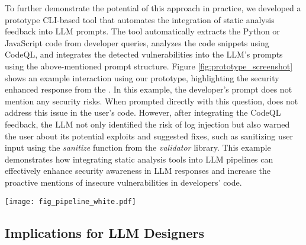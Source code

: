 To further demonstrate the potential of this approach in practice, we developed a prototype CLI-based tool that automates the integration of static analysis feedback into LLM prompts. The tool automatically extracts the Python or JavaScript code from developer queries, analyzes the code snippets using CodeQL, and integrates the detected vulnerabilities into the LLM’s prompts using the above-mentioned prompt structure. Figure \ref{fig:prototype_screenshot} shows an example interaction using our prototype, highlighting the security enhanced response from the \gpt. In this example, the developer's prompt does not mention any security risks. When prompted directly with this question, \gpt does not address this issue in the user's code. However, after integrating the CodeQL feedback, the LLM not only identified the risk of log injection but also warned the user about its potential exploits and suggested fixes, such as sanitizing user input using the \textit{sanitize} function from the \textit{validator} library. This example demonstrates how integrating static analysis tools into LLM pipelines can effectively enhance security awareness in LLM responses and increase the proactive mentions of insecure vulnerabilities in developers' code.

\begin{figure*}[t]
    \centering
    \texttt{[image: fig\_pipeline\_white.pdf]}
    \caption{Left: The original user prompt featuring vulnerable code. Right: The LLM's response after prompt modification (integrating CodeQL feedback). Both the prompt and response have been abbreviated for presentation clarity.}
    \label{fig:prototype_screenshot}
\end{figure*}


\subsection{Implications for LLM Designers}
\label{implications_llm_designers}


